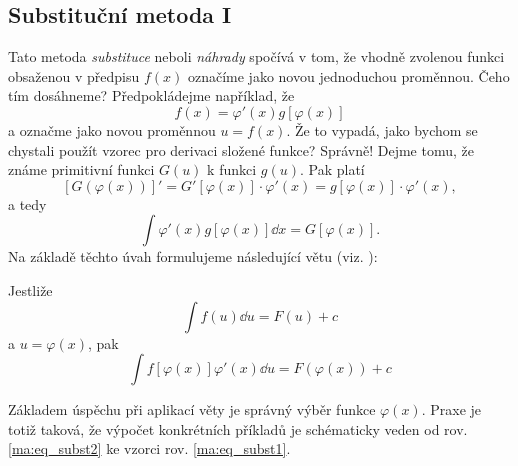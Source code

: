     \subsection{Substituční metoda I}
      Tato metoda \emph{substituce} neboli \emph{náhrady} spočívá v tom, že vhodně zvolenou funkci
      obsaženou v předpisu \(f(x)\) označíme jako novou jednoduchou proměnnou. Čeho tím dosáhneme?
      Předpokládejme například, že \[f(x)=\varphi'(x)g[\varphi(x)]\] a označme jako novou proměnnou
      \(u = f(x)\). Že to vypadá, jako bychom se chystali použít vzorec pro derivaci složené funkce?
      Správně! Dejme tomu, že známe primitivní funkci \(G(u)\) k funkci \(g(u)\). Pak platí
      \begin{equation*}
        \left[G\left(\varphi(x)\right)\right]' = G'\left[\varphi(x)\right]\cdot\varphi'(x) 
        = g\left[\varphi(x)\right]\cdot\varphi'(x),     
      \end{equation*}
      a tedy
      \begin{equation*}
        \int \varphi'(x) g\left[\varphi(x)\right]\dd{x} =  G\left[\varphi(x)\right]. 
      \end{equation*}      
      Na základě těchto úvah formulujeme následující větu (viz. \cite[p.~142]{diblik2002}):
      \begin{mdframed}[style=mdmathlemma]
        \begin{lemma}\label{mai:lemma009}
          Jestliže
          \begin{equation}\label{ma:eq_subst1}
            \int{f(u)\dd{u}}=F(u)+c
          \end{equation}
          a $u=\varphi(x)$, pak
          \begin{equation}\label{ma:eq_subst2}
              \int{f[\varphi(x)]\varphi'(x)\dd{u}}=F(\varphi(x))+c
          \end{equation}
        \end{lemma}
      \end{mdframed}
  
      Základem úspěchu při aplikací věty je správný výběr funkce $\varphi(x)$. Praxe je totiž
      taková, že výpočet konkrétních příkladů je schématicky veden od rov. \ref{ma:eq_subst2} ke
      vzorci rov. \ref{ma:eq_subst1}.

      

